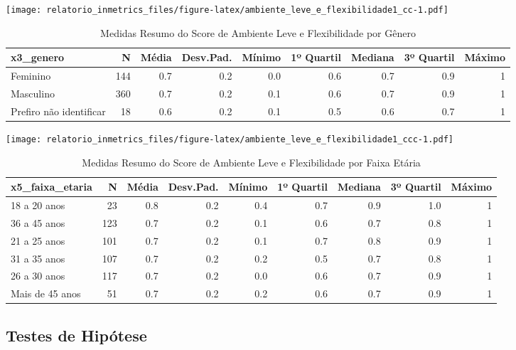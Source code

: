 \documentclass[]{book}
\begin{document}
\texttt{[image: relatorio\_inmetrics\_files/figure-latex/ambiente\_leve\_e\_flexibilidade1\_cc-1.pdf]}

\begin{table}[t]

\caption{\label{tab:unnamed-chunk-31}Medidas Resumo do Score de Ambiente Leve e Flexibilidade por Gênero}
\centering
\fontsize{7}{9}\selectfont
\begin{tabular}{lrrrrrrrr}
\toprule
x3\_genero & N & Média & Desv.Pad. & Mínimo & 1º Quartil & Mediana & 3º Quartil & Máximo\\
\midrule
Feminino & 144 & 0.7 & 0.2 & 0.0 & 0.6 & 0.7 & 0.9 & 1\\
Masculino & 360 & 0.7 & 0.2 & 0.1 & 0.6 & 0.7 & 0.9 & 1\\
Prefiro não identificar & 18 & 0.6 & 0.2 & 0.1 & 0.5 & 0.6 & 0.7 & 1\\
\bottomrule
\end{tabular}
\end{table}

\texttt{[image: relatorio\_inmetrics\_files/figure-latex/ambiente\_leve\_e\_flexibilidade1\_ccc-1.pdf]}

\begin{table}[t]

\caption{\label{tab:unnamed-chunk-32}Medidas Resumo do Score de Ambiente Leve e Flexibilidade por Faixa Etária}
\centering
\fontsize{7}{9}\selectfont
\begin{tabular}{lrrrrrrrr}
\toprule
x5\_faixa\_etaria & N & Média & Desv.Pad. & Mínimo & 1º Quartil & Mediana & 3º Quartil & Máximo\\
\midrule
18 a 20 anos & 23 & 0.8 & 0.2 & 0.4 & 0.7 & 0.9 & 1.0 & 1\\
36 a 45 anos & 123 & 0.7 & 0.2 & 0.1 & 0.6 & 0.7 & 0.8 & 1\\
21 a 25 anos & 101 & 0.7 & 0.2 & 0.1 & 0.7 & 0.8 & 0.9 & 1\\
31 a 35 anos & 107 & 0.7 & 0.2 & 0.2 & 0.5 & 0.7 & 0.8 & 1\\
26 a 30 anos & 117 & 0.7 & 0.2 & 0.0 & 0.6 & 0.7 & 0.9 & 1\\
\addlinespace
Mais de 45 anos & 51 & 0.7 & 0.2 & 0.2 & 0.6 & 0.7 & 0.9 & 1\\
\bottomrule
\end{tabular}
\end{table}

\pagebreak

\hypertarget{testes-de-hipotese-11}{%
\subsection{Testes de Hipótese}\label{testes-de-hipotese-11}}
\end{document}
